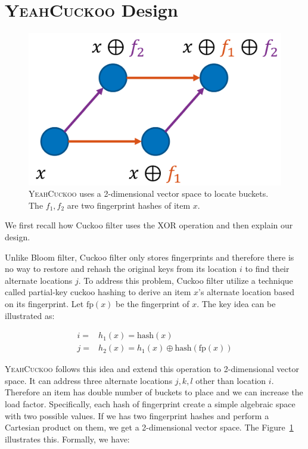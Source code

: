 \documentclass[11pt]{IEEEtran}
\newcommand{\sys}{\textsc{YeahCuckoo}\xspace}
\begin{document}
\section{\sys Design}

\begin{figure}
\centering
\includegraphics[width=0.6\linewidth]{design.png}
\caption{\sys uses a 2-dimensional vector space to locate buckets. The $f_1,f_2$ are two fingerprint hashes of item $x$.}
\label{design}
\end{figure}

We first recall how Cuckoo filter uses the XOR operation and then explain our design. 

Unlike Bloom filter, Cuckoo filter only stores fingerprints and therefore there is no way to restore and rehash the original keys from its location $i$ to find their alternate locations $j$. To address this problem, Cuckoo filter utilize a technique called partial-key cuckoo hashing to derive an item $x$'s alternate location based on its fingerprint. Let $\text{fp}(x)$ be the fingerprint of $x$. The key idea can be illustrated as:

\begin{equation*}
\begin{split}
i =& h_1(x) = \text{hash}(x) \\
j =& h_2(x) = h_1(x) \oplus \text{hash}(\text{fp}(x))
\end{split}
\end{equation*}

\sys follows this idea and extend this operation to 2-dimensional vector space. It can address three alternate locations $j, k, l$ other than location $i$. Therefore an item has double number of buckets to place and we can increase the load factor. Specifically, each hash of fingerprint create a simple algebraic space with two possible values. If we has two fingerprint hashes and perform a Cartesian product on them, we get a 2-dimensional vector space. The Figure~\ref{design} illustrates this. Formally, we have:
\end{document}
